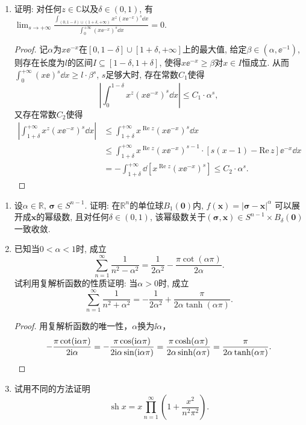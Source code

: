 \begin{quiza}
\begin{enumerate}
\item 证明: 对任何\(z\in\mathbb{C}\)以及\(\delta\in(0,1)\), 
有\(\lim_{s\rightarrow+\infty}\frac{\displaystyle\int_{(0,1-\delta)\cup(1+\delta,+\infty)}x^z\left(x\ee^{-x}\right)^s\dd x}
{\displaystyle\int_{0}^{+\infty}\left(x\ee^{-x}\right)^s\dd x}=0.\)
\begin{proof}
记\(\alpha\)为\(x\ee^{-x}\)在\([0,1-\delta]\cup[1+\delta,+\infty]\)上的最大值, 
给定\(\beta\in(\alpha,\ee^{-1})\), 则存在长度为\(l\)的区间\(I\subseteq[1-\delta,1+\delta]\), 
使得\(x\ee^{-x}\geqslant \beta\)对\(x\in I\)恒成立. 
从而\(\int_{0}^{+\infty}\left(x\ee\right)^s\dd x\geqslant l\cdot\beta^s\), 
\(s\)足够大时, 存在常数\(C_1\)使得
\[\left|\int_{0}^{1-\delta}x^z(x\ee^{-x})^{s}\dd x\right|
\leqslant C_1\cdot\alpha^s,\]又存在常数\(C_2\)使得\[\begin{split}
\left|\int_{1+\delta}^{+\infty}x^z(x\ee^{-x})^s\dd x\right|
&\leqslant\int_{1+\delta}^{+\infty}x^{\operatorname{Re}z}(x\ee^{-x})^s\dd x\\
&\leqslant\int_{1+\delta}^{+\infty}x^{\operatorname{Re}z}(x\ee^{-x})^{s-1}\cdot\left[s(x-1)-\mathrm{Re}\,z\right]\ee^{-x}\dd x\\
&=-\int_{1+\delta}^{+\infty}\dd\left[x^{\operatorname{Re}z}(x\ee^{-x})^s\right]
\leqslant C_2\cdot\alpha^s.
\end{split}\]
\end{proof}
\end{enumerate}
\end{quiza}

\begin{quizb}
\begin{enumerate}
\item 设\(\alpha\in\mathbb{R}\), \(\boldsymbol{\sigma}\in S^{n-1}\). 
证明: 在\(\mathbb{R}^n\)的单位球\(B_1(\boldsymbol{0})\)内, 
\(f(\boldsymbol{x})=|\boldsymbol{\sigma}-\boldsymbol{x}|^\alpha\)
可以展开成\(\boldsymbol{x}\)的幂级数, 且对任何\(\delta\in(0,1)\), 
该幂级数关于\((\boldsymbol{\sigma},\boldsymbol{x})\in S^{n-1}\times B_{\delta}(\boldsymbol{0})\)一致收敛.

\item 已知当\(0<\alpha<1\)时, 成立\[\sum_{n=1}^{\infty}\frac{1}{n^2-\alpha^2}
=\frac{1}{2\alpha^2}-\frac{\pi\cot (\alpha\pi)}{2\alpha}.\]
试利用复解析函数的性质证明: 当\(\alpha>0\)时, 成立
\[\sum_{n=1}^{\infty}\frac{1}{n^2+\alpha^2}
=-\frac{1}{2\alpha^2}+\frac{\pi}{2\alpha\tanh(\alpha\pi)}.\]
\begin{proof}
用复解析函数的唯一性，$\alpha$换为$\ii\alpha$，
\[-\frac{\pi\cot(\mathrm{i}\alpha\pi)}{2\mathrm{i}\alpha}
=-\frac{\pi\cos(\mathrm{i}\alpha\pi)}{2\mathrm{i}\alpha\sin(\mathrm{i}\alpha\pi)}
=\frac{\pi\cosh(\alpha\pi)}{2\alpha\sinh(\alpha\pi)}
=\frac{\pi}{2\alpha\tanh(\alpha\pi)}.\qedhere\]
\end{proof}

\item 试用不同的方法证明\[\operatorname{sh}x=x\prod_{n=1}^{\infty}\left(1+\frac{x^2}{n^2\pi^2}\right).\]
\end{enumerate}
\end{quizb}

